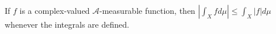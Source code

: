 If $f$ is a complex-valued $\mathcal{A}$-measurable function, then $|\int_X f d\mu| \leq \int_X |f| d\mu$ whenever the integrals are defined.

